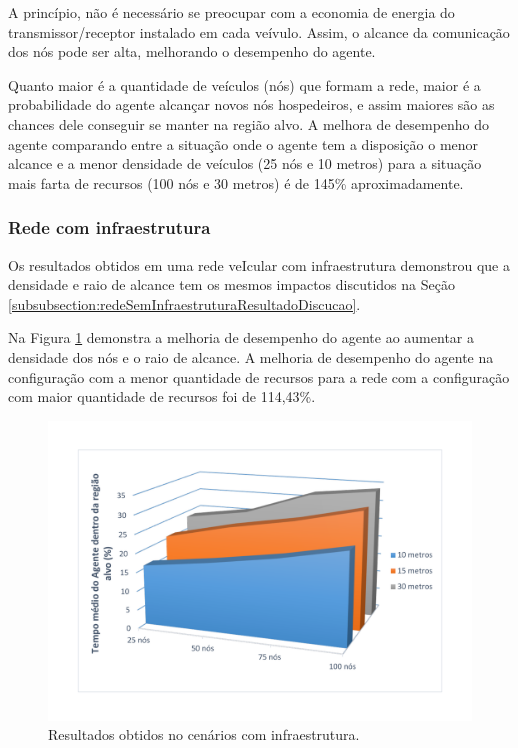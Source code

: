A princípio, não é necessário se preocupar com a economia de energia do transmissor/receptor instalado em cada veívulo. Assim, o alcance da comunicação dos nós pode ser alta, melhorando o desempenho do agente. 

Quanto maior é a quantidade de veículos (nós) que formam a rede, maior é a probabilidade do agente alcançar novos nós hospedeiros, e assim maiores são as chances dele conseguir se manter na região alvo. A melhora de desempenho do agente comparando entre a situação onde o agente tem a disposição o menor alcance e a menor densidade de veículos (25 nós e 10 metros) para a situação mais farta de recursos (100 nós e 30 metros) é de 145\% aproximadamente.   


\subsubsection{Rede com infraestrutura}

	Os resultados obtidos em uma rede veIcular com infraestrutura demonstrou que a densidade e raio de alcance tem os mesmos impactos discutidos na Seção \ref{subsubsection:redeSemInfraestruturaResultadoDiscucao}.

	Na Figura \ref{fig:graficosComTorres} demonstra a melhoria de desempenho do agente ao aumentar a densidade dos nós e o raio de alcance. A melhoria de desempenho do agente na configuração com a menor quantidade de recursos para a rede com a configuração com maior quantidade de recursos foi de 114,43\%.   
 

	\begin{figure}[htbp]
		\centering
		\includegraphics[scale=0.34]{resultados/graficos/graficoComTorres.pdf}
		\caption{Resultados obtidos no cenários com infraestrutura.}
		\label{fig:graficosComTorres}
	\end{figure}

